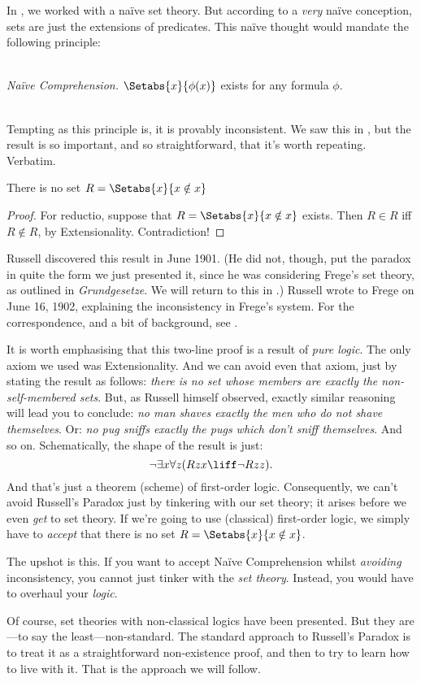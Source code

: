 \documentclass[../../../include/open-logic-section]{subfiles}
\begin{document}

In , we worked with a na\"{i}ve set theory. But
according to a \emph{very} na\"{i}ve conception, sets are just the
extensions of predicates. This na\"ive thought would mandate the
following principle:

\
\\\emph{Na\"{i}ve Comprehension.} $\Setabs{x}{\phi(x)}$ exists for any formula $\phi$.

\
\\Tempting as this principle is, it is provably inconsistent. We saw this in , but the result is so important, and so straightforward, that it's worth repeating. Verbatim.

\begin{thm}
There is no set $R = \Setabs{x}{x \notin x}$
\end{thm}

\begin{proof}
For reductio, suppose that $R = \Setabs{x}{x \notin x}$ exists. Then $R \in R$ iff $R \notin R$, by Extensionality. Contradiction!
\end{proof}

Russell discovered this result in June 1901. (He did not, though, put
the paradox in quite the form we just presented it, since he was
considering Frege's set theory, as outlined in \emph{Grundgesetze}. We
will return to this in \olref[blv]{sec}.) Russell wrote to
Frege on June 16, 1902, explaining the inconsistency in Frege's
system. For the correspondence, and a bit of background, see
\citet[pp.~124--8]{Heijenoort1967}. 

It is worth emphasising that this two-line proof is a result of
\emph{pure logic}. The only axiom we used was Extensionality. And we
can avoid even {that} axiom, just by stating the result as follows:
\emph{there is no set whose members are exactly the non-self-membered
sets}. But, as Russell himself observed, exactly similar reasoning
will lead you to conclude: \emph{no man shaves exactly the men who do
not shave themselves}. Or: \emph{no pug sniffs exactly the pugs which
don't sniff themselves}. And so on. Schematically, the shape of the
result is just: 
\[
\lnot \exists x \forall z(Rzx \liff \lnot R zz).
\]
And that's just a theorem (scheme) of first-order logic. Consequently,
we can't avoid Russell's Paradox just by tinkering with our set
theory; it arises before we even \emph{get} to set theory. If we're
going to use (classical) first-order logic, we simply have to
\emph{accept} that there is no set $R = \Setabs{x}{x\notin x}$. 

The upshot is this. If you want to accept Na\"{i}ve Comprehension
whilst \emph{avoiding} inconsistency, you cannot just tinker with the
\emph{set theory}. Instead, you would have to overhaul your
\emph{logic}.

Of course, set theories with non-classical logics have been presented.
But they are---to say the least---non-standard. The standard approach
to Russell's Paradox is to treat it as a straightforward non-existence
proof, and then to try to learn how to live with it. That is the
approach we will follow.
\end{document}
